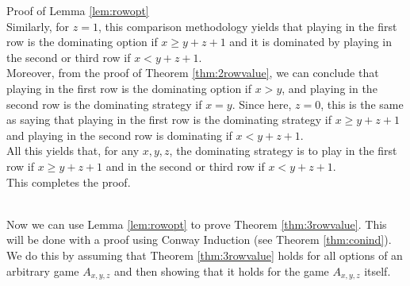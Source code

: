 \begin{proof2}{Proof of Lemma \ref{lem:rowopt}}
\\
Similarly, for $z=1$, this comparison methodology yields that playing in the first row is the dominating option if $x\ge y+z+1$ and it is dominated by playing in the second or third row if $x<y+z+1$.
\\
Moreover, from the proof of Theorem \ref{thm:2rowvalue}, we can conclude that playing in the first row is the dominating option if $x>y$, and playing in the second row is the dominating strategy if $x=y$. Since here, $z=0$, this is the same as saying that playing in the first row is the dominating strategy if $x\ge y+z+1$ and playing in the second row is dominating if $x<y+z+1$. 
\\
All this yields that, for any $x,y,z$, the dominating strategy is to play in the first row if $x\ge y+z+1$ and in the second or third row if $x<y+z+1$.
\\
This completes the proof.
\end{proof2}
~\\
Now we can use Lemma \ref{lem:rowopt} to prove Theorem \ref{thm:3rowvalue}. 
This will be done with a proof using Conway Induction (see Theorem \ref{thm:conind}). We do this by assuming that Theorem \ref{thm:3rowvalue} holds for all options of an arbitrary game $A_{x,y,z}$ and then showing that it holds for the game $A_{x,y,z}$ itself.


